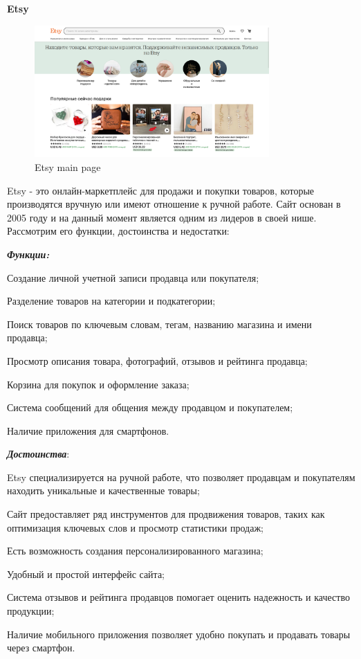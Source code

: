 \textbf{Etsy}

\begin{figure}[h]
    \centering
    \includegraphics[width=0.8\textwidth]{./images/etsy_main.png}
    \caption{Etsy main page}
\end{figure}


Etsy - это онлайн-маркетплейс для продажи и покупки товаров, которые производятся вручную или имеют отношение к ручной работе. Сайт основан в 2005 году и на данный момент является одним из лидеров в своей нише. Рассмотрим его функции, достоинства и недостатки:

\textbf{\emph{Функции:}}

\begin{compactitem}
    \item  Создание личной учетной записи продавца или покупателя;
    \item  Разделение товаров на категории и подкатегории;
    \item  Поиск товаров по ключевым словам, тегам, названию магазина и имени продавца;
    \item  Просмотр описания товара, фотографий, отзывов и рейтинга продавца;
    \item  Корзина для покупок и оформление заказа;
    \item  Система сообщений для общения между продавцом и покупателем;
    \item  Наличие приложения для смартфонов.
\end{compactitem}

\textbf{\emph{Достоинства}}:

\begin{compactitem}
    \item  Etsy специализируется на ручной работе, что позволяет продавцам и покупателям находить уникальные и качественные товары;
    \item  Сайт предоставляет ряд инструментов для продвижения товаров, таких как оптимизация ключевых слов и просмотр статистики продаж;
    \item  Есть возможность создания персонализированного магазина;
    \item  Удобный и простой интерфейс сайта;
    \item  Система отзывов и рейтинга продавцов помогает оценить надежность и качество продукции;
    \item  Наличие мобильного приложения позволяет удобно покупать и продавать товары через смартфон.
\end{compactitem}

